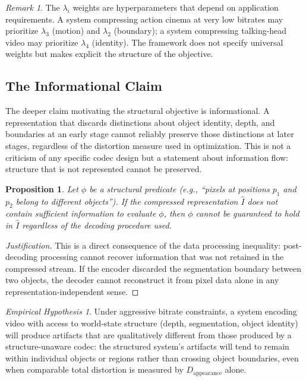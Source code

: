 \documentclass[12pt,a4paper]{article}
\theoremstyle{plain}
\newtheorem{proposition}[theorem]{Proposition}
\theoremstyle{definition}
\theoremstyle{remark}
\newtheorem{remark}[theorem]{Remark}
\newtheorem{hypothesis}[theorem]{Empirical Hypothesis}
\begin{document}
\begin{remark}
The $\lambda_i$ weights are hyperparameters that depend on application requirements. A system compressing action cinema at very low bitrates may prioritize $\lambda_3$ (motion) and $\lambda_2$ (boundary); a system compressing talking-head video may prioritize $\lambda_4$ (identity). The framework does not specify universal weights but makes explicit the structure of the objective.
\end{remark}

\subsection{The Informational Claim}

The deeper claim motivating the structural objective is informational. A representation that discards distinctions about object identity, depth, and boundaries at an early stage cannot reliably preserve those distinctions at later stages, regardless of the distortion measure used in optimization. This is not a criticism of any specific codec design but a statement about information flow: structure that is not represented cannot be preserved.

\begin{proposition}
\label{prop:infoclaim}
Let $\phi$ be a structural predicate (e.g., ``pixels at positions $p_1$ and $p_2$ belong to different objects''). If the compressed representation $\hat{I}$ does not contain sufficient information to evaluate $\phi$, then $\phi$ cannot be guaranteed to hold in $\hat{I}$ regardless of the decoding procedure used.
\end{proposition}

\begin{proof}[Justification]
This is a direct consequence of the data processing inequality: post-decoding processing cannot recover information that was not retained in the compressed stream. If the encoder discarded the segmentation boundary between two objects, the decoder cannot reconstruct it from pixel data alone in any representation-independent sense.
\end{proof}

\begin{hypothesis}
\label{hyp:structure-ratedistortion}
Under aggressive bitrate constraints, a system encoding video with access to world-state structure (depth, segmentation, object identity) will produce artifacts that are qualitatively different from those produced by a structure-unaware codec: the structured system's artifacts will tend to remain within individual objects or regions rather than crossing object boundaries, even when comparable total distortion is measured by $D_{\mathrm{appearance}}$ alone.
\end{hypothesis}
\end{document}
